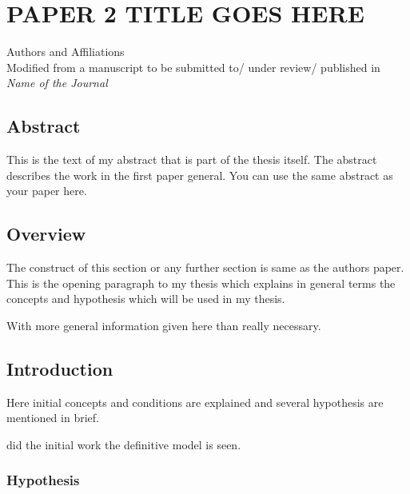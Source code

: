 \chapter{PAPER 2 TITLE GOES HERE}

\begin{center}
    Authors and Affiliations \\
    Modified from a manuscript to be submitted to/ under review/ published in \textit{Name of the Journal}
\end{center}

\section{Abstract}
This is the text of my abstract that is part of the thesis itself.
The abstract describes the work in the first paper general. You can use the same abstract as your paper here.



\section{Overview}

The  construct of this section or any further section is same as the authors paper.
This is the opening paragraph to my thesis which
explains in general terms the concepts and hypothesis
which will be used in my thesis.

With more general information given here than really
necessary.

\section{Introduction}

Here initial concepts and conditions are explained and
several hypothesis are mentioned in brief.

did the initial work
the definitive model is seen.

\subsection{Hypothesis}

